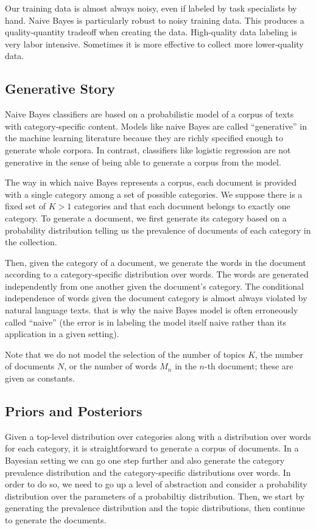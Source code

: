 Our training data is almost always noisy, even if labeled by task
specialists by hand.  Naive Bayes is particularly robust to noisy
training data.  This produces a quality-quantity tradeoff when
creating the data.  High-quality data labeling is very labor
intensive.  Sometimes it is more effective to collect more
lower-quality data.  



\subsection{Generative Story}

Naive Bayes classifiers are based on a probabilistic model of a corpus
of texts with category-specific content.  Models like naive Bayes are
called ``generative'' in the machine learning literature because they
are richly specified enough to generate whole corpora.  In contrast,
classifiers like logistic regression are not generative in the sense
of being able to generate a corpus from the model.

The way in which naive Bayes represents a corpus, each document is
provided with a single category among a set of possible categories.
We suppose there is a fixed set of $K > 1$ categories and that each
document belongs to exactly one category.  To generate a document, we
first generate its category based on a probability distribution
telling us the prevalence of documents of each category in the
collection.

Then, given the category of a document, we generate the words in the
document according to a category-specific distribution over words.
The words are generated independently from one another given the
document's category.  The conditional independence of words given the
document category is almost always violated by natural language texts.
that is why the naive Bayes model is often erroneously called
``naive'' (the error is in labeling the model itself naive rather
than its application in a given setting).

Note that we do not model the selection of the number of topics $K$,
the number of documents $N$, or the number of words $M_n$ in the
$n$-th document; these are given as constants.  

\subsection{Priors and Posteriors}

Given a top-level distribution over categories along with a
distribution over words for each category, it is straightforward to
generate a corpus of documents.  In a Bayesian setting we can go one
step further and also generate the category prevalence distribution
and the category-specific distributions over words.  In order to do
so, we need to go up a level of abstraction and consider a probability
distribution over the parameters of a probabiltiy distribution.  Then,
we start by generating the prevalence distribution and the topic
distributions, then continue to generate the documents.  

